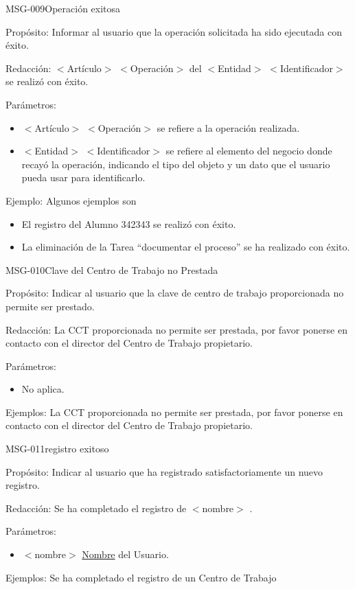 \begin{cdtMessage}[msgInfoColor]{MSG-009}{Operación exitosa}
	\item[Propósito:] Informar al usuario que la operación solicitada ha sido ejecutada con éxito.
	\item[Redacción:] $<$Artículo$>$ $<$Operación$>$ del $<$Entidad$>$ $<$Identificador$>$ se realizó con éxito.
	\item[Parámetros:]\hspace{1pt}
	\begin{itemize}
		\item $<$Artículo$>$ $<$Operación$>$ se refiere a la operación realizada.
		\item $<$Entidad$>$ $<$Identificador$>$ se refiere al elemento del negocio donde recayó la operación, indicando el tipo del objeto y un dato que el usuario pueda usar para identificarlo.
	\end{itemize}
	\item[Ejemplo:] Algunos ejemplos son
	\begin{itemize}
		\item El registro del Alumno 342343 se realizó con éxito.
		\item La eliminación de la Tarea ``documentar el proceso'' se ha realizado con éxito.
	\end{itemize}
\end{cdtMessage}
\begin{cdtMessage}[msgErrorColor]{MSG-010}{Clave del Centro de Trabajo no Prestada} 
	\item[Propósito:] Indicar al usuario que la clave de centro de trabajo proporcionada no permite ser prestado.
	\item[Redacción:] La CCT proporcionada no permite ser prestada, por favor ponerse en contacto con el director del Centro de Trabajo propietario.
	\item[Parámetros:] \hspace{1cm}
	\begin{itemize}
		\item No aplica.
	\end{itemize}
	\item[Ejemplos:] La CCT proporcionada no permite ser prestada, por favor ponerse en contacto con el director del Centro de Trabajo propietario.
\end{cdtMessage}
\begin{cdtMessage}[msgInfoColor]{MSG-011}{registro exitoso}
	\item[Propósito:] Indicar al usuario que ha registrado satisfactoriamente un nuevo registro.
	\item[Redacción:] Se ha completado el registro de $<$nombre$>$ .
	\item[Parámetros:] \hspace{1cm}
	\begin{itemize}
		\item $<$nombre$>$ \hyperlink{Usuario.nombre}{Nombre} del Usuario.
	\end{itemize}
	\item[Ejemplos:] Se ha completado el registro de un Centro de Trabajo
\end{cdtMessage}
